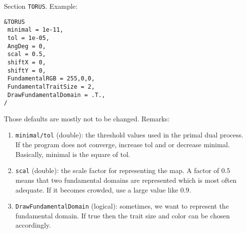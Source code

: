 \documentclass[12pt]{amsart}
\begin{document}
Section {\tt TORUS}. Example:
\begin{verbatim}
&TORUS
 minimal = 1e-11,
 tol = 1e-05,
 AngDeg = 0,
 scal = 0.5,
 shiftX = 0,
 shiftY = 0,
 FundamentalRGB = 255,0,0,
 FundamentalTraitSize = 2,
 DrawFundamentalDomain = .T.,
/
\end{verbatim}
Those defaults are mostly not to be changed. Remarks:
\begin{enumerate}
\item {\tt minimal/tol} (double): the threshold values used in the primal dual process. If the program does not converge, increase tol and or decrease minimal. Basically, minimal is the square of tol.
\item {\tt scal} (double): the scale factor for representing the map. A factor of $0.5$ means that two fundamental domains are represented which is most often adequate. If it becomes crowded, use a large value like $0.9$.
\item {\tt DrawFundamentalDomain} (logical): sometimes, we want to represent the fundamental domain. If true then the trait size and color can be chosen accordingly.
\end{enumerate}
\end{document}
